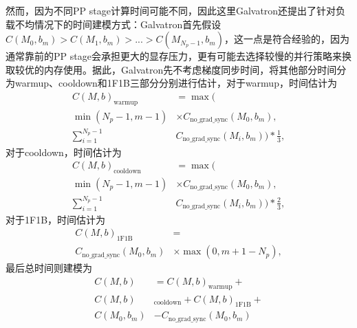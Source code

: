 \documentclass{thuemp}
\begin{document}
然而，因为不同PP stage计算时间可能不同，因此这里Galvatron还提出了针对负载不均情况下的时间建模方式：Galvatron首先假设$C(M_0,b_m) > C(M_1,b_m) > ... > C(M_{N_p-1},b_m)$，这一点是符合经验的，因为通常靠前的PP stage会承担更大的显存压力，更有可能去选择较慢的并行策略来换取较优的内存使用。据此，Galvatron先不考虑梯度同步时间，将其他部分时间分为warmup、cooldown和1F1B三部分分别进行估计，对于warmup，时间估计为
\begin{align*}
C(M,b)_{\text{warmup}}  & = \max( \\
\min (N_p -1, m-1) & \times C_{\text{no\_grad\_sync}}(M_0,b_m),  \\
\sum_{i=1}^{N_p-1} & C_{\text{no\_grad\_sync}}(M_i,b_m)) * \frac 1 3,
\end{align*}
对于cooldown，时间估计为
\begin{align*}
C(M,b)_{\text{cooldown}}  & = \max( \\
\min (N_p -1, m-1) & \times C_{\text{no\_grad\_sync}}(M_0,b_m),  \\
\sum_{i=1}^{N_p-1} & C_{\text{no\_grad\_sync}}(M_i,b_m)) * \frac 2 3,
\end{align*}
对于1F1B，时间估计为
\begin{align*}
C(M,b)_{\text{1F1B}}  & = \\
C_{\text{no\_grad\_sync}}(M_0,b_m)  & \times \max(0, m + 1 - N_p),
\end{align*}
最后总时间则建模为
\begin{align*}
C(M,b)  & = C(M,b)_{\text{warmup}} + \\
C(M,b)&_{\text{cooldown}} + C(M,b)_{\text{1F1B}} + \\
C(M_0,b_m)& - C_{\text{no\_grad\_sync}}(M_0,b_m)
\end{align*}



% 
% 
\end{document}
